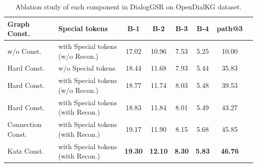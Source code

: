 \begin{table}[t]
    \small
    \centering
    \begin{tabular}{l|l|cccc|cc}
        \toprule
          {Graph Const.} & {Special tokens} &  {B-1} & {B-2} & {B-3} & {B-4} & path@3\\
         \midrule 
        w/o Const.  & with Special tokens (w/o Recon.) & 17.02&10.96& 7.53& 5.25  &10.00\\
        Hard Const. & w/o Special tokens &  18.44 & 11.68 & 7.93 & 5.44  & 35.83\\
        Hard Const. & with Special tokens (w/o Recon.) &  18.77 & 11.74 & 8.03 & 5.48  & 39.53\\
        Hard Const. & with Special tokens (with Recon.) &  18.83 & 11.84 &8.01 & 5.49  & 43.27\\
        Connection Const. & with Special tokens (with Recon.) &  19.17&11.90& 8.15& 5.68 &  45.85\\
        Katz Const.& with Special tokens (with Recon.) &  \textbf{19.30}&\textbf{12.10}& \textbf{8.30}& \textbf{5.83} &  \textbf{46.76}\\
        \bottomrule
    \end{tabular}
    \caption{\label{tab:ablation}Ablation study of each component in DialogGSR on OpenDialKG dataset.}
\end{table}

